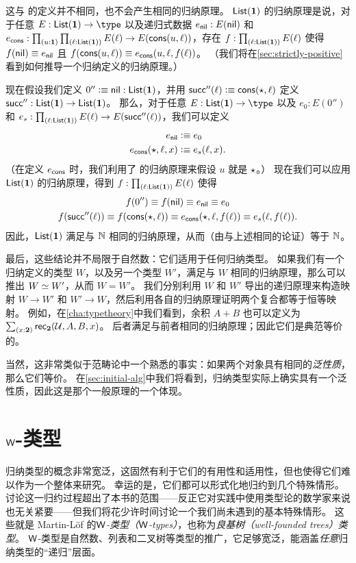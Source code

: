 这与 \nat 的定义并不相同，也不会产生相同的归纳原理。
$\mathsf{List}(\mathbf{1})$ 的归纳原理是说，对于任意 $E:\lst\unit\to\type$ 以及递归式数据 $e_{\mathsf{nil}}:E(\mathsf{nil})$ 和 $e_\cons : \prd{u:\unit}{\ell:\lst\unit} E(\ell) \to E(\cons(u,\ell))$，存在 $f:\prd{\ell:\lst\unit} E(\ell)$ 使得 $f(\mathsf{nil})\equiv e_{\mathsf{nil}}$ 且 $f(\mathsf{cons}(u,\ell))\equiv e_{\mathsf{cons}}(u,\ell,f(\ell))$。
（我们将在\cref{sec:strictly-positive}看到如何推导一个归纳定义的归纳原理。）

现在假设我们定义 $0'' \vcentcolon\equiv \mathsf{nil}: \mathsf{List}(\mathbf{1})$，并用 $\mathsf{succ}''(\ell) \vcentcolon\equiv \mathsf{cons}(\star,\ell)$ 定义 $\mathsf{succ}'':\mathsf{List}(\mathbf{1})\to\mathsf{List}(\mathbf{1})$。
那么，对于任意 $E:\lst\unit\to\type$ 以及 $e_0:E(0'')$ 和 $e_s:\prd{\ell:\lst\unit} E(\ell) \to E(\suc''(\ell))$，我们可以定义
\begin{align*}
  e_{\mathsf{nil}} &\vcentcolon\equiv e_0\\
  e_{\mathsf{cons}}(\star,\ell,x) &\vcentcolon\equiv e_s(\ell,x).
\end{align*}
（在定义 $e_{\mathsf{cons}}$ 时，我们利用了 \unit 的归纳原理来假设 $u$ 就是 $\star$。）
现在我们可以应用 $\mathsf{List}(\mathbf{1})$ 的归纳原理，得到 $f:\prd{\ell:\lst\unit} E(\ell)$ 使得
\begin{gather*}
  f(0'') \equiv f(\mathsf{nil}) \equiv e_{\mathsf{nil}} \equiv e_0\\
  f(\mathsf{succ}''(\ell)) \equiv f(\mathsf{cons}(\star,\ell)) \equiv e_{\mathsf{cons}}(\star,\ell,f(\ell)) \equiv e_s(\ell,f(\ell)).
\end{gather*}
因此，$\mathsf{List}(\mathbf{1})$ 满足与 $\mathbb{N}$ 相同的归纳原理，从而（由与上述相同的论证）等于 $\mathbb{N}$。

最后，这些结论并不局限于自然数：它们适用于任何归纳类型。
如果我们有一个归纳定义的类型 $W$，以及另一个类型 $W'$，满足与 $W$ 相同的归纳原理，那么可以推出 $W \simeq W'$，从而 $W=W'$。
我们分别利用 $W$ 和 $W'$ 导出的递归原理来构造映射 $W\to W'$ 和 $W'\to W$，然后利用各自的归纳原理证明两个复合都等于恒等映射。
例如，在\cref{cha:typetheory}中我们看到，余积 $A+B$ 也可以定义为$\sm{x:\bool} \rec{\bool}(\UU,A,B,x)$。
后者满足与前者相同的归纳原理；因此它们是典范等价的。

当然，这非常类似于范畴论中一个熟悉的事实：如果两个对象具有相同的\emph{泛性质}，那么它们等价。
在\cref{sec:initial-alg}中我们将看到，归纳类型实际上确实具有一个泛性质，因此这是那个一般原理的一个体现。

\section{\texorpdfstring{$\mathsf{W}$}{W}-类型}
\label{sec:w-types}

归纳类型的概念非常宽泛，这固然有利于它们的有用性和适用性，但也使得它们难以作为一个整体来研究。
幸运的是，它们都可以形式化地归约到几个特殊情形。
讨论这一归约过程超出了本书的范围——反正它对实践中使用类型论的数学家来说也无关紧要——但我们将花少许时间讨论一个我们尚未遇到的基本特殊情形。
这些就是 Martin-L{\"o}f 的\emph{$\mathsf{W}$-类型（$\mathsf{W}$-types）}，也称为\emph{良基树（well-founded trees）类型}。
%
$\mathsf{W}$-类型是自然数、列表和二叉树等类型的推广，它足够宽泛，能涵盖\emph{任意}归纳类型的``递归''层面。

